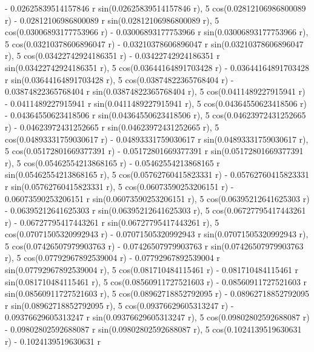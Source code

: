 \documentclass[a4paper,10pt]{article}
\begin{document}
\begin{eulernotebook}
\begin{eulercomment}
\begin{eulercomment}
\begin{eulercomment}
\begin{eulercomment}
\begin{eulercomment}
\begin{eulercomment}
\begin{eulercomment}
\begin{eulercomment}
\begin{eulercomment}
\begin{eulercomment}
\begin{eulercomment}
\begin{eulercomment}
\begin{eulercomment}
\begin{eulercomment}
\begin{eulercomment}
\begin{eulercomment}
\begin{eulercomment}
\begin{eulercomment}
\begin{eulercomment}
\begin{eulercomment}
\begin{eulercomment}
\begin{eulercomment}
\begin{eulercomment}
\begin{eulercomment}
\begin{eulercomment}
\begin{eulercomment}
\begin{eulercomment}
\begin{eulercomment}
\begin{euleroutput}
   - 0.02625839514157846 r sin(0.02625839514157846 r), 
  5 cos(0.02812106986800089 r) - 0.02812106986800089 r
   sin(0.02812106986800089 r), 5 cos(0.03006893177753966 r)
   - 0.03006893177753966 r sin(0.03006893177753966 r), 
  5 cos(0.03210378606896047 r) - 0.03210378606896047 r
   sin(0.03210378606896047 r), 5 cos(0.03422742924186351 r)
   - 0.03422742924186351 r sin(0.03422742924186351 r), 
  5 cos(0.03644164891703428 r) - 0.03644164891703428 r
   sin(0.03644164891703428 r), 5 cos(0.03874822365768404 r)
   - 0.03874822365768404 r sin(0.03874822365768404 r), 
  5 cos(0.0411489227915941 r) - 0.0411489227915941 r
   sin(0.0411489227915941 r), 5 cos(0.04364550623418506 r)
   - 0.04364550623418506 r sin(0.04364550623418506 r), 
  5 cos(0.04623972431252665 r) - 0.04623972431252665 r
   sin(0.04623972431252665 r), 5 cos(0.04893331759030617 r)
   - 0.04893331759030617 r sin(0.04893331759030617 r), 
  5 cos(0.05172801669377391 r) - 0.05172801669377391 r
   sin(0.05172801669377391 r), 5 cos(0.05462554213868165 r)
   - 0.05462554213868165 r sin(0.05462554213868165 r), 
  5 cos(0.05762760415823331 r) - 0.05762760415823331 r
   sin(0.05762760415823331 r), 5 cos(0.06073590253206151 r)
   - 0.06073590253206151 r sin(0.06073590253206151 r), 
  5 cos(0.06395212641625303 r) - 0.06395212641625303 r
   sin(0.06395212641625303 r), 5 cos(0.06727795417443261 r)
   - 0.06727795417443261 r sin(0.06727795417443261 r), 
  5 cos(0.07071505320992943 r) - 0.07071505320992943 r
   sin(0.07071505320992943 r), 5 cos(0.07426507979903763 r)
   - 0.07426507979903763 r sin(0.07426507979903763 r), 
  5 cos(0.07792967892539004 r) - 0.07792967892539004 r
   sin(0.07792967892539004 r), 5 cos(0.081710484115461 r)
   - 0.081710484115461 r sin(0.081710484115461 r), 
  5 cos(0.08560911727521603 r) - 0.08560911727521603 r
   sin(0.08560911727521603 r), 5 cos(0.08962718852792095 r)
   - 0.08962718852792095 r sin(0.08962718852792095 r), 
  5 cos(0.09376629605313247 r) - 0.09376629605313247 r
   sin(0.09376629605313247 r), 5 cos(0.09802802592688087 r)
   - 0.09802802592688087 r sin(0.09802802592688087 r), 
  5 cos(0.1024139519630631 r) - 0.1024139519630631 r

\end{euleroutput}
\end{eulercomment}
\end{eulercomment}
\end{eulercomment}
\end{eulercomment}
\end{eulercomment}
\end{eulercomment}
\end{eulercomment}
\end{eulercomment}
\end{eulercomment}
\end{eulercomment}
\end{eulercomment}
\end{eulercomment}
\end{eulercomment}
\end{eulercomment}
\end{eulercomment}
\end{eulercomment}
\end{eulercomment}
\end{eulercomment}
\end{eulercomment}
\end{eulercomment}
\end{eulercomment}
\end{eulercomment}
\end{eulercomment}
\end{eulercomment}
\end{eulercomment}
\end{eulercomment}
\end{eulercomment}
\end{eulercomment}
\end{eulernotebook}
\end{document}
